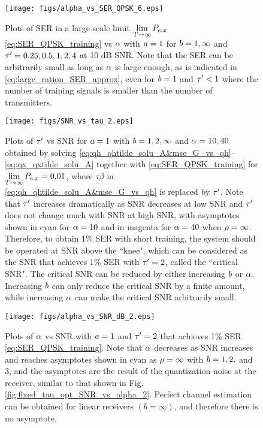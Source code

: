 \documentclass[12pt, draftclsnofoot,journal,onecolumn]{IEEEtran}
\begin{document}
\begin{figure}
\texttt{[image: figs/alpha\_vs\_SER\_QPSK\_6.eps]}
\centering
    \caption{Plots of SER in a large-scale limit $\lim\limits_{T\to\infty} P_{e,x}$ \eqref{eq:SER_QPSK_training} vs $\alpha$ with $a=1$ for $b=1, \infty$ and $\tau'=0.25, 0.5, 1, 2, 4$ at 10 dB SNR. Note that the SER can be arbitrarily small as long as $\alpha$ is large enough, as is indicated in \eqref{eq:large_ration_SER_approx}, even for $b=1$ and $\tau'<1$ where the number of training signals is smaller than the number of transmitters.}
    \label{fig:alpha_vs_SER_QPSK}
\end{figure}
\begin{figure}
\texttt{[image: figs/SNR\_vs\_tau\_2.eps]}
\centering
    \caption{Plots of $\tau'$ vs SNR for $a=1$ with $b=1,2,\infty$ and $\alpha=10, 40$ obtained by solving \eqref{eq:qh_qhtilde_solu_A&mse_G_vs_qh}--\eqref{eq:qx_qxtilde_solu_A} together with \eqref{eq:SER_QPSK_training} for  $\lim\limits_{T\to\infty} P_{e,x}=0.01$, where $\tau\beta$ in \eqref{eq:qh_qhtilde_solu_A&mse_G_vs_qh} is replaced by $\tau'$. Note that $\tau'$ increases dramatically as SNR decreases at low SNR and $\tau'$ does not change much with SNR at high SNR, with asymptotes shown in cyan for $\alpha=10$ and in magenta for $\alpha=40$ when $\rho=\infty$. Therefore, to obtain 1\% SER with short training, the system should be operated at SNR above the ``knee", which can be considered as the SNR that achieves 1\% SER with $\tau'=2$, called the ``critical SNR". The critical SNR can be reduced by either increasing $b$ or $\alpha$. Increasing $b$ can only reduce the critical SNR by a finite amount, while increasing $\alpha$ can make the critical SNR arbitrarily small.}
    \label{fig:SNR_vs_tau}
\end{figure}

\begin{figure}
\texttt{[image: figs/alpha\_vs\_SNR\_dB\_2.eps]}
\centering
    \caption{Plots of $\alpha$ vs SNR with $a=1$ and $\tau'=2$ that achieves 1\% SER \eqref{eq:SER_QPSK_training}. Note that $\alpha$ decreases as SNR increases and reaches asymptotes shown in cyan as $\rho=\infty$ with $b=1,2,$ and $3$, and the asymptotes are the result of the quantization noise at the receiver, similar to that shown in Fig. \eqref{fig:fixed_tau_opt_SNR_vs_alpha_2}. Perfect channel estimation can be obtained for linear receivers $(b=\infty)$, and therefore there is no asymptote.}
    \label{fig:alpha_vs_SNR_dB}
\end{figure}
\end{document}
